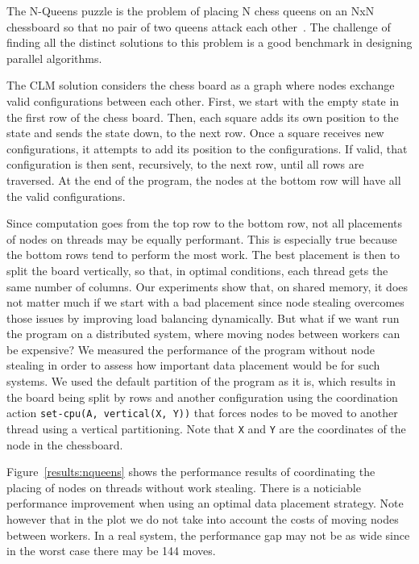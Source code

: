 The N-Queens puzzle is the problem of placing N chess queens on an NxN
chessboard so that no pair of two queens attack each
other~\cite{8queens}. The challenge of finding all the
distinct solutions to this problem is a good benchmark in designing
parallel algorithms.

The CLM solution considers the chess board as a graph where nodes exchange valid
configurations between each other. First, we start with the empty
state in the first row of the chess board. Then, each square adds its own
position to the state and sends the state down, to the next row. Once a square
receives new configurations, it attempts to add its position to the
configurations. If valid, that configuration is then sent, recursively, to the
next row, until all rows are traversed. At the end of the program, the nodes at
the bottom row will have all the valid configurations.

Since computation goes from the top row to the bottom row, not all placements of
nodes on threads may be equally performant. This is especially true because the
bottom rows tend to perform the most work. The best placement is then to split the
board vertically, so that, in optimal conditions, each thread gets the same
number of columns.  Our experiments show that, on shared memory, it does not
matter much if we start with a bad placement since node stealing overcomes those
issues by improving load balancing dynamically. But what if we want run the
program on a distributed system, where moving nodes between workers can be
expensive? We measured the performance of the program without node stealing in
order to assess how important data placement would be for such systems.
We used the default partition of the program as it is, which results in the board being
split by rows and another configuration using the coordination action
\texttt{set-cpu(A, vertical(X, Y))} that forces nodes to be moved to another
thread using a vertical partitioning. Note that \texttt{X} and \texttt{Y} are
the coordinates of the node in the chessboard.

Figure~\ref{results:nqueens} shows the performance results of coordinating the
placing of nodes on threads without work stealing. There is a noticiable
performance improvement when using an optimal data placement strategy. Note
however that in the plot we do not take into account the costs of moving
nodes between workers. In a real system, the performance gap may not be as wide
since in the worst case there may be 144 moves.

\begin{topfig}
   \begin{center}
   \end{center}
\end{topfig}
